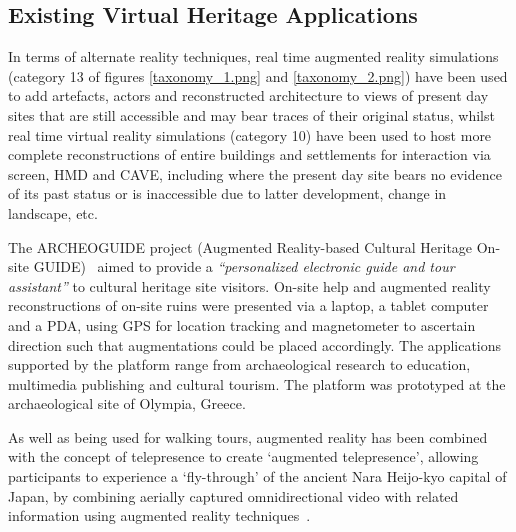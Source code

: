 
\subsection{Existing Virtual Heritage Applications}
\label{existing-virtual-heritage-applications}
In terms of alternate reality techniques, real time augmented reality simulations (category 13 of figures \ref{taxonomy_1.png} and \ref{taxonomy_2.png}) have been used to add artefacts, actors and reconstructed architecture to views of present day sites that are still accessible and may bear traces of their original status, whilst real time virtual reality simulations (category 10) have been used to host more complete reconstructions of entire buildings and settlements for interaction via screen, HMD and CAVE, including where the present day site bears no evidence of its past status or is inaccessible due to latter development, change in landscape, etc.


The ARCHEOGUIDE project (Augmented Reality-based Cultural Heritage On-site GUIDE)~\cite{vlahakis:archeoguide} aimed to provide a \textit{``personalized electronic guide and tour assistant''} to cultural heritage site visitors. On-site help and augmented reality reconstructions of on-site ruins were presented via a laptop, a tablet computer and a PDA, using GPS for location tracking and magnetometer to ascertain direction such that augmentations could be placed accordingly. The applications supported by the platform range from archaeological research to education, multimedia publishing and cultural tourism. The platform was prototyped at the archaeological site of Olympia, Greece.

As well as being used for walking tours, augmented reality has been combined with the concept of telepresence to create `augmented telepresence', allowing participants to experience a `fly-through' of the ancient Nara Heijo-kyo capital of Japan, by combining aerially captured omnidirectional video with related information using augmented reality techniques~\cite{Okura2006,Okura2011}.

